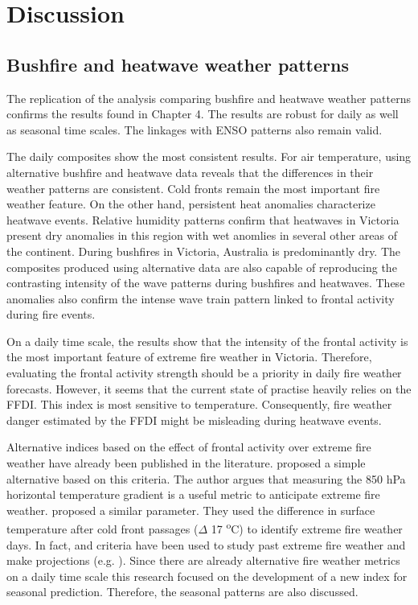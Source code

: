 \section{Discussion}


\subsection{Bushfire and heatwave weather patterns}

The replication of the analysis comparing bushfire and heatwave weather
patterns confirms the results found in Chapter 4. The results are
robust for daily as well as seasonal time scales. The linkages with
ENSO patterns also remain valid. 

The daily composites show the most consistent results. For air temperature,
using alternative bushfire and heatwave data reveals that the differences
in their weather patterns are consistent. Cold fronts remain the most
important fire weather feature. On the other hand, persistent heat
anomalies characterize heatwave events. Relative humidity patterns
confirm that heatwaves in Victoria present dry anomalies in this region
with wet anomlies in several other areas of the continent. During
bushfires in Victoria, Australia is predominantly dry. The composites
produced using alternative data are also capable of reproducing the
contrasting intensity of the wave patterns during bushfires and heatwaves.
These anomalies also confirm the intense wave train pattern linked
to frontal activity during fire events. 

On a daily time scale, the results show that the intensity of the
frontal activity is the most important feature of extreme fire weather
in Victoria. Therefore, evaluating the frontal activity strength should
be a priority in daily fire weather forecasts. However, it seems that
the current state of practise heavily relies on the FFDI. This index
is most sensitive to temperature. Consequently, fire weather danger
estimated by the FFDI might be misleading during heatwave events. 

Alternative indices based on the effect of frontal activity over extreme
fire weather have already been published in the literature. \citet{Mills2005}
proposed a simple alternative based on this criteria. The author argues
that measuring the 850 hPa horizontal temperature gradient is a useful
metric to anticipate extreme fire weather. \citet{Reeder2015} proposed
a similar parameter. They used the difference in surface temperature
after cold front passages (\ensuremath{\Delta} 17 \textsuperscript{o}C)
to identify extreme fire weather days. In fact, \citet{Mills2005}
and \citet{Reeder2015} criteria have been used to study past extreme
fire weather and make projections (e.g. \citet{Hasson2009}). Since
there are already alternative fire weather metrics on a daily time
scale this research focused on the development of a new index for
seasonal prediction. Therefore, the seasonal patterns are also discussed.

